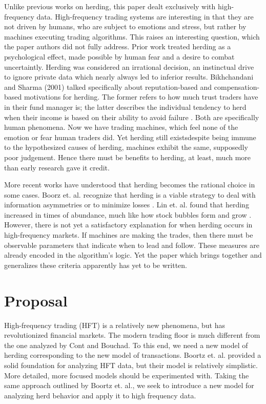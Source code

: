 \documentclass{article}
\begin{document}
Unlike previous works on herding, this paper dealt exclusively with high-frequency data. 
High-frequency trading systems are interesting in that they are not driven by humans, who are subject to emotions and stress, but rather by machines executing trading algorithms. 
This raises an interesting question, which the paper authors did not fully address.
Prior work treated herding as a psychological effect, made possible by human fear and a desire to combat uncertaintly. 
Herding was considered an irrational decision, an instinctual drive to ignore private data which nearly always led to inferior results. 
Bikhchandani and Sharma (2001) talked specifically about reputation-based and compensation-based motivations for herding. 
The former refers to how much trust traders have in their fund manager is; the latter describes the individual tendency to herd when their income is based on their ability to avoid failure \cite{bikhchandani}.
Both are specifically human phenomena.
Now we have trading machines, which feel none of the emotion or fear human traders did. 
Yet herding still exists\textemdash despite being immune to the hypothesized causes of herding, machines exhibit the same, supposedly poor judgement.
Hence there must be benefits to herding, at least, much more than early research gave it credit. 

More recent works have understood that herding becomes the rational choice in some cases. 
Boorz et. al. recognize that herding is a viable strategy to deal with information asymmetries or to minimize losses \cite{boortz}.
Lin et. al. found that herding increased in times of abundance, much like how stock bubbles form and grow \cite{lin}.
However, there is not yet a satisfactory explanation for when herding occurs in high-frequency markets.
If machines are making the trades, then there must be observable parameters that indicate when to lead and follow.
These measures are already encoded in the algorithm's logic. 
Yet the paper which brings together and generalizes these criteria apparently has yet to be written.

\section{Proposal}

High-frequency trading (HFT) is a relatively new phenomena, but has revolutionized financial markets.
The modern trading floor is much different from the one analyzed by Cont and Bouchad.
To this end, we need a new model of herding corresponding to the new model of transactions.
Boortz et. al. provided a solid foundation for analyzing HFT data, but their model is relatively simplistic. 
More detailed, more focused models should be experimented with.
Taking the same approach outlined by Boortz et. al., we seek to introduce a new model for analyzing herd behavior and apply it to high frequency data. 
\end{document}
